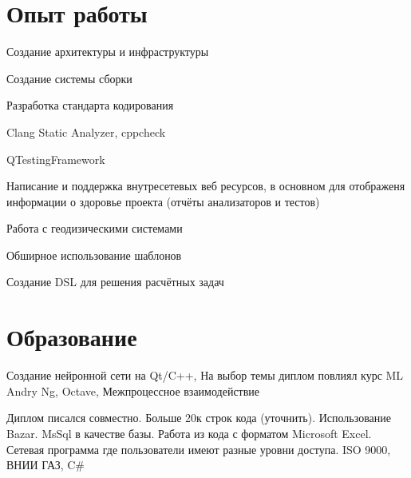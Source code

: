 \documentclass[a4paper]{curricula-vitae}
\begin{document}
\begin{minipage}[t]{0.66\textwidth} %

\section{Опыт работы} 


\begin{tightitemize}
\item Создание архитектуры и инфраструктуры
\item Создание системы сборки
\item Разработка стандарта кодирования
\item Clang Static Analyzer, cppcheck
\item QTestingFramework
\item Написание и поддержка внутресетевых веб ресурсов, в основном для отображеня
информации о здоровье проекта (отчёты анализаторов и тестов)
\item Работа с геодизическими системами
\end{tightitemize}


\begin{tightitemize}
\item Обширное использование шаблонов
\item Создание DSL для решения расчётных задач
\end{tightitemize}

\section{Образование} 


Создание нейронной сети на Qt/C++, На выбор темы диплом повлиял курс ML Andry Ng, Octave,
Межпроцессное взаимодействие


Диплом писался совместно. Больше 20к строк кода (уточнить). Использование Bazar.
MsSql в качестве базы. Работа из кода с форматом Microsoft Excel.
Сетевая программа где пользователи имеют разные уровни доступа.
ISO 9000, ВНИИ ГАЗ, C\#

\end{minipage} %

\end{document}
